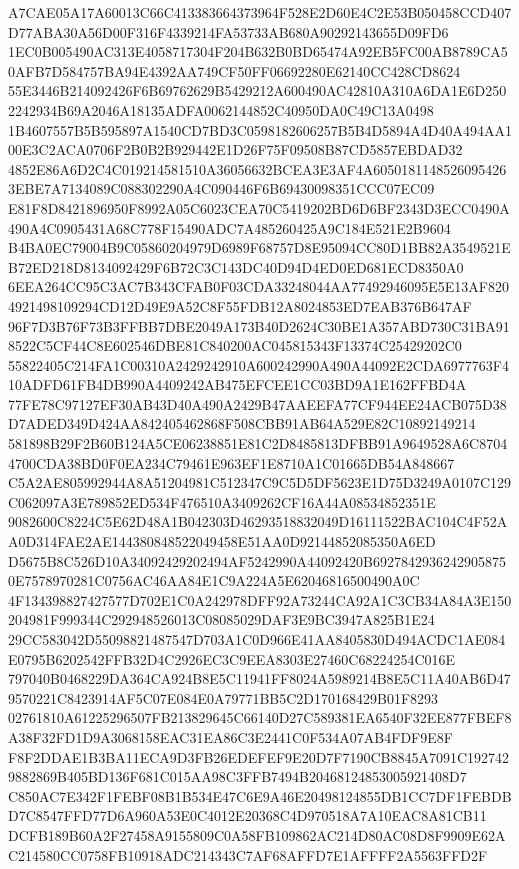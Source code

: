 \documentclass[UTF8,fontset=fandol,zihao=-4,a4paper]{ctexart}
\begin{document}
{{A7CAE05A17A60013C66C413383664373964F528E2D60E4C2E53B050458CCD407D77ABA30A56D00F316F4339214FA53733AB680A90292143655D09FD6
1EC0B005490AC313E4058717304F204B632B0BD65474A92EB5FC00AB8789CA50AFB7D584757BA94E4392AA749CF50FF06692280E62140CC428CD8624
55E3446B214092426F6B69762629B5429212A600490AC42810A310A6DA1E6D2502242934B69A2046A18135ADFA0062144852C40950DA0C49C13A0498
1B4607557B5B595897A1540CD7BD3C0598182606257B5B4D5894A4D40A494AA100E3C2ACA0706F2B0B2B929442E1D26F75F09508B87CD5857EBDAD32
4852E86A6D2C4C019214581510A36056632BCEA3E3AF4A60501811485260954263EBE7A7134089C088302290A4C090446F6B69430098351CCC07EC09
E81F8D8421896950F8992A05C6023CEA70C5419202BD6D6BF2343D3ECC0490A490A4C0905431A68C778F15490ADC7A485260425A9C184E521E2B9604
B4BA0EC79004B9C05860204979D6989F68757D8E95094CC80D1BB82A3549521EB72ED218D8134092429F6B72C3C143DC40D94D4ED0ED681ECD8350A0
6EEA264CC95C3AC7B343CFAB0F03CDA33248044AA77492946095E5E13AF8204921498109294CD12D49E9A52C8F55FDB12A8024853ED7EAB376B647AF
96F7D3B76F73B3FFBB7DBE2049A173B40D2624C30BE1A357ABD730C31BA918522C5CF44C8E602546DBE81C840200AC045815343F13374C25429202C0
55822405C214FA1C00310A2429242910A600242990A490A44092E2CDA6977763F410ADFD61FB4DB990A4409242AB475EFCEE1CC03BD9A1E162FFBD4A
77FE78C97127EF30AB43D40A490A2429B47AAEEFA77CF944EE24ACB075D38D7ADED349D424AA842405462868F508CBB91AB64A529E82C10892149214
581898B29F2B60B124A5CE06238851E81C2D8485813DFBB91A9649528A6C87044700CDA38BD0F0EA234C79461E963EF1E8710A1C01665DB54A848667
C5A2AE805992944A8A51204981C512347C9C5D5DF5623E1D75D3249A0107C129C062097A3E789852ED534F476510A3409262CF16A44A08534852351E
9082600C8224C5E62D48A1B042303D46293518832049D16111522BAC104C4F52AA0D314FAE2AE144380848522049458E51AA0D92144852085350A6ED
D5675B8C526D10A34092429202494AF5242990A44092420B69278429362429058750E7578970281C0756AC46AA84E1C9A224A5E62046816500490A0C
4F134398827427577D702E1C0A242978DFF92A73244CA92A1C3CB34A84A3E150204981F999344C292948526013C08085029DAF3E9BC3947A825B1E24
29CC583042D55098821487547D703A1C0D966E41AA8405830D494ACDC1AE084E0795B6202542FFB32D4C2926EC3C9EEA8303E27460C68224254C016E
797040B0468229DA364CA924B8E5C11941FF8024A5989214B8E5C11A40AB6D479570221C8423914AF5C07E084E0A79771BB5C2D170168429B01F8293
02761810A61225296507FB213829645C66140D27C589381EA6540F32EE877FBEF8A38F32FD1D9A3068158EAC31EA86C3E2441C0F534A07AB4FDF9E8F
F8F2DDAE1B3BA11ECA9D3FB26EDEFEF9E20D7F7190CB8845A7091C1927429882869B405BD136F681C015AA98C3FFB7494B20468124853005921408D7
C850AC7E342F1FEBF08B1B534E47C6E9A46E20498124855DB1CC7DF1FEBDBD7C8547FFD77D6A960A53E0C4012E20368C4D970518A7A10EAC8A81CB11
DCFB189B60A2F27458A9155809C0A58FB109862AC214D80AC08D8F9909E62AC214580CC0758FB10918ADC214343C7AF68AFFD7E1AFFFF2A5563FFD2F
}}
\end{document}
